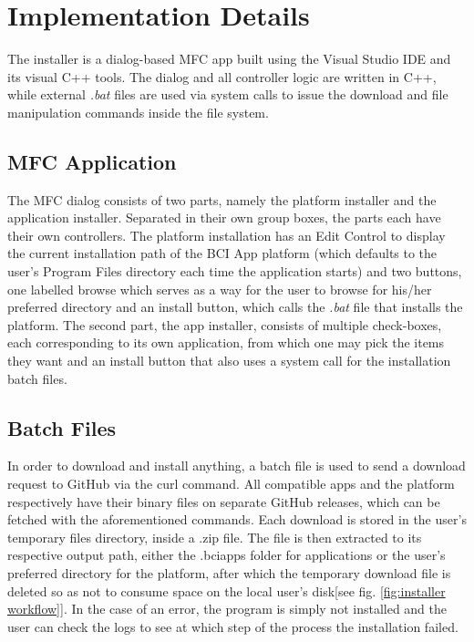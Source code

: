 \section{Implementation Details} \label{sect: Installer implementation}
The installer is a dialog-based MFC app built using the Visual Studio IDE and its visual C++ tools. The dialog and all controller logic are written in C++, while external \textit{.bat} files are used via system calls to issue the download and file manipulation commands inside the file system.

\subsection{MFC Application} \label{subsect: Installer MFC application}
The MFC dialog consists of two parts, namely the platform installer and the application installer. Separated in their own group boxes, the parts each have their own controllers. The platform installation has an Edit Control to display the current installation path of the BCI App platform (which defaults to the user's Program Files directory each time the application starts) and two buttons, one labelled browse which serves as a way for the user to browse for his/her preferred directory and an install button, which calls the \textit{.bat} file that installs the platform. The second part, the app installer, consists of multiple check-boxes, each corresponding to its own application, from which one may pick the items they want and an install button that also uses a system call for the installation batch files. 

\subsection{Batch Files} \label{subsect: Installer batch files}
In order to download and install anything, a batch file is used to send a download request to GitHub via the curl command. All compatible apps and the platform respectively have their binary files on separate GitHub releases, which can be fetched with the aforementioned commands. Each download is stored in the user's temporary files directory, inside a .zip file. The file is then extracted to its respective output path, either the .bciapps folder for applications or the user's preferred directory for the platform, after which the temporary download file is deleted so as not to consume space on the local user's disk[see fig. \ref{fig:installer workflow}]. In the case of an error, the program is simply not installed and the user can check the logs to see at which step of the process the installation failed.


